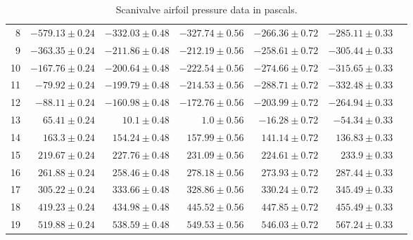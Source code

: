 \documentclass[runningheads]{llncs}
\begin{document}
\begin{table}
\begin{center}
\begin{tabular}{rrrrrrr}
8  &    $-579.13\pm0.24$ &   $-332.03\pm0.48$ &   $-327.74\pm0.56$ &   $-266.36\pm0.72$ &   $-285.11\pm0.33$ \\
9  &    $-363.35\pm0.24$ &   $-211.86\pm0.48$ &   $-212.19\pm0.56$ &   $-258.61\pm0.72$ &   $-305.44\pm0.33$ \\
10 & $-167.76\pm0.24$ &   $-200.64\pm0.48$ &   $-222.54\pm0.56$ &   $-274.66\pm0.72$ &   $-315.65\pm0.33$ \\
11 &   $-79.92\pm0.24$ &   $-199.79\pm0.48$ &   $-214.53\pm0.56$ &   $-288.71\pm0.72$ &   $-332.48\pm0.33$ \\
12 &   $-88.11\pm0.24$ &   $-160.98\pm0.48$ &   $-172.76\pm0.56$ &   $-203.99\pm0.72$ &   $-264.94\pm0.33$ \\
13 &    $65.41\pm0.24$ &      $10.1\pm0.48$ &       $1.0\pm0.56$ &    $-16.28\pm0.72$ &    $-54.34\pm0.33$ \\
14 &    $163.3\pm0.24$ &    $154.24\pm0.48$ &    $157.99\pm0.56$ &    $141.14\pm0.72$ &    $136.83\pm0.33$ \\
15 &   $219.67\pm0.24$ &    $227.76\pm0.48$ &    $231.09\pm0.56$ &    $224.61\pm0.72$ &     $233.9\pm0.33$ \\
16 &   $261.88\pm0.24$ &    $258.46\pm0.48$ &    $278.18\pm0.56$ &    $273.93\pm0.72$ &    $287.44\pm0.33$ \\
17 &    $305.22\pm0.24$ &    $333.66\pm0.48$ &    $328.86\pm0.56$ &    $330.24\pm0.72$ &    $345.49\pm0.33$ \\
18 &   $419.23\pm0.24$ &    $434.98\pm0.48$ &    $445.52\pm0.56$ &    $447.85\pm0.72$ &    $455.49\pm0.33$ \\
19 &   $519.88\pm0.24$ &    $538.59\pm0.48$ &    $549.53\pm0.56$ &    $546.03\pm0.72$ &    $567.24\pm0.33$ \\
\bottomrule
\end{tabular}
\end{center}
\caption{Scanivalve airfoil pressure data in pascals.}
\label{tab:pressure_scanivalve_airfoil}
\end{table}
\end{document}
